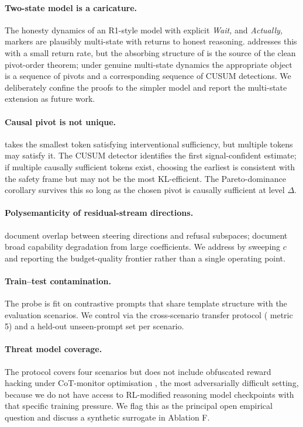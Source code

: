 \documentclass[11pt]{article}
\theoremstyle{definition}
\newcommand{\1}{\mathbf{1}}
\begin{document}
\paragraph{Two-state model is a caricature.} The honesty dynamics of an R1-style model with explicit \emph{Wait,} and \emph{Actually,} markers are plausibly multi-state with returns to honest reasoning.  addresses this with a small return rate, but the absorbing structure of  is the source of the clean pivot-order theorem; under genuine multi-state dynamics the appropriate object is a sequence of pivots and a corresponding sequence of CUSUM detections. We deliberately confine the proofs to the simpler model and report the multi-state extension as future work.

\paragraph{Causal pivot is not unique.}  takes the smallest token satisfying interventional sufficiency, but multiple tokens may satisfy it. The CUSUM detector identifies the first signal-confident estimate; if multiple causally sufficient tokens exist, choosing the earliest is consistent with the safety frame but may not be the most KL-efficient. The Pareto-dominance corollary survives this so long as the chosen pivot is causally sufficient at level $\Delta$.

\paragraph{Polysemanticity of residual-stream directions.} \citet{li2026safety} document overlap between steering directions and refusal subspaces; \citet{pres2024reliable} document broad capability degradation from large coefficients. We address by sweeping $c$ and reporting the budget-quality frontier rather than a single operating point.

\paragraph{Train--test contamination.} The probe is fit on contrastive prompts that share template structure with the evaluation scenarios. We control via the cross-scenario transfer protocol ( metric 5) and a held-out unseen-prompt set per scenario.

\paragraph{Threat model coverage.} The protocol covers four scenarios but does not include obfuscated reward hacking under CoT-monitor optimisation \citep{baker2025monitoring}, the most adversarially difficult setting, because we do not have access to RL-modified reasoning model checkpoints with that specific training pressure. We flag this as the principal open empirical question and discuss a synthetic surrogate in Ablation F.
\end{document}
